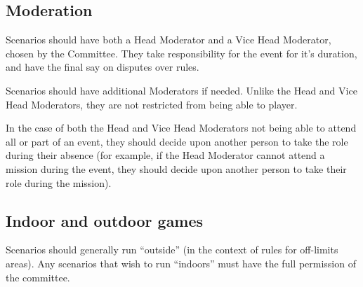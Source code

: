 \documentclass{report}
\begin{document}
	\subsection{Moderation}

	Scenarios should have both a Head Moderator and a Vice Head Moderator, chosen by the Committee. They take responsibility for the event for it's duration, and have the final say on disputes over rules.
	
	Scenarios should have additional Moderators if needed. Unlike the Head and Vice Head Moderators, they are not restricted from being able to player.

	In the case of both the Head and Vice Head Moderators not being able to attend all or part of an event, they should decide upon another person to take the role during their absence (for example, if the Head Moderator cannot attend a mission during the event, they should decide upon another person to take their role during the mission).

	\subsection{Indoor and outdoor games}
	
	Scenarios should generally run ``outside'' (in the context of rules for off-limits areas). Any scenarios that wish to run ``indoors'' must have the full permission of the committee.
\end{document}
